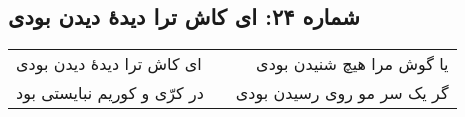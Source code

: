 \begin{center}
\section*{شماره ۲۴: ای کاش ترا دیدۀ دیدن بودی}
\label{sec:024}
\begin{longtable}{l p{0.5cm} r}
ای کاش ترا دیدهٔ دیدن بودی
&&
یا گوش مرا هیچ شنیدن بودی
\\
در کرّی و کوریم نبایستی بود
&&
گر یک سر مو روی رسیدن بودی
\\
\end{longtable}
\end{center}
